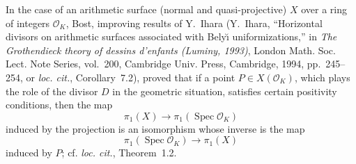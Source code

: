 \documentclass[10pt,a4paper]{article}
\begin{document}
In the case of an arithmetic surface (normal and quasi-projective) $X$ over a
ring of integers $\mathcal O_K$, Bost, improving results of Y.~Ihara
(Y.~Ihara, ``Horizontal divisors on arithmetic surfaces associated with
Bely\u{\i} uniformizations,'' in \emph{The Grothendieck theory of dessins
d'enfants (Luminy, 1993)}, London Math. Soc. Lect. Note Series, vol.~200,
Cambridge Univ. Press, Cambridge, 1994, pp.~245--254, or \emph{loc. cit.},
Corollary~7.2), proved that if a point
$P\in X(\mathcal O_K)$, which plays the role of the divisor $D$ in the
geometric situation, satisfies certain positivity conditions, then the map
\[
  \pi_1(X)\longrightarrow\pi_1(\operatorname{Spec}\mathcal O_K)
\]
induced by the projection is an isomorphism whose inverse is the map
\[
  \pi_1(\operatorname{Spec}\mathcal O_K)\longrightarrow\pi_1(X)
\]
induced by $P$; cf. \emph{loc. cit.}, Theorem~1.2.

\medskip
{}
\end{document}
